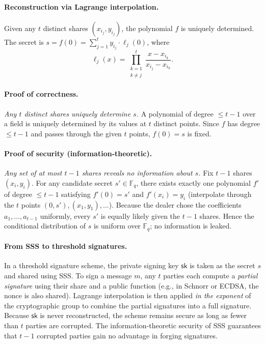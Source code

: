 \paragraph{Reconstruction via Lagrange interpolation.}
Given any $t$ distinct shares $(x_{i_j}, y_{i_j})$, the polynomial $f$ is uniquely determined.
The secret is $s = f(0) = \sum_{j=1}^{t} y_{i_j} \cdot \ell_j(0)$, where
\[
\ell_j(x) = \prod_{\substack{k=1\\ k \neq j}}^{t} \frac{x - x_{i_k}}{x_{i_j} - x_{i_k}}.
\]

\paragraph{Proof of correctness.}
\textit{Any $t$ distinct shares uniquely determine $s$.} A polynomial of degree $\le t-1$
over a field is uniquely determined by its values at $t$ distinct points. Since $f$ has
degree $\le t-1$ and passes through the given $t$ points, $f(0)=s$ is fixed.

\paragraph{Proof of security (information‑theoretic).}
\textit{Any set of at most $t-1$ shares reveals no information about $s$.}
Fix $t-1$ shares $(x_i, y_i)$. For any candidate secret $s' \in \mathbb{F}_q$, there
exists exactly one polynomial $f'$ of degree $\le t-1$ satisfying $f'(0)=s'$ and
$f'(x_i)=y_i$ (interpolate through the $t$ points $(0,s'), (x_1,y_1),\dots$). Because the
dealer chose the coefficients $a_1,\dots,a_{t-1}$ uniformly, every $s'$ is equally likely
given the $t-1$ shares. Hence the conditional distribution of $s$ is uniform over
$\mathbb{F}_q$; no information is leaked.

\paragraph{From SSS to threshold signatures.}
In a threshold signature scheme, the private signing key $\mathsf{sk}$ is taken as the
secret $s$ and shared using SSS. To sign a message $m$, any $t$ parties each compute a
\textit{partial signature} using their share and a public function (e.g., in Schnorr or
ECDSA, the nonce is also shared). Lagrange interpolation is then applied \emph{in the
exponent} of the cryptographic group to combine the partial signatures into a full
signature. Because $\mathsf{sk}$ is never reconstructed, the scheme remains secure as
long as fewer than $t$ parties are corrupted. The information‑theoretic security of SSS
guarantees that $t-1$ corrupted parties gain no advantage in forging signatures.

